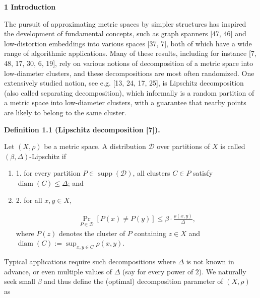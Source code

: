\par\medskip\noindent\textbf{1 Introduction}\par
The pursuit of approximating metric spaces by simpler structures has inspired the development of fundamental concepts, such as graph spanners [47, 46] and low-distortion embeddings into various spaces [37, 7], both of which have a wide range of algorithmic applications. Many of these results, including for instance [7, 48, 17, 30, 6, 19], rely on various notions of decomposition of a metric space into low-diameter clusters, and these decompositions are most often randomized. One extensively studied notion, see e.g. [13, 24, 17, 25], is Lipschitz decomposition (also called separating decomposition), which informally is a random partition of a metric space into low-diameter clusters, with a guarantee that nearby points are likely to belong to the same cluster.
\par
\par
\par\medskip\noindent\textbf{Definition 1.1 (Lipschitz decomposition [7]).}\par
Let $(X,\rho)$ be a metric space. A distribution $\mathcal{D}$ over partitions of $X$ is called $(\beta,\Delta)$-Lipschitz if
\par
\begin{enumerate}
\item  1. 
for every partition $P\in\operatorname{supp}(\mathcal{D})$, all clusters $C\in P$ satisfy $\operatorname{diam}(C)\leq\Delta$; and
\par
\par
\item  2. 
for all $x,y\in X$,
\par
\[\begin{aligned}
\Pr_{P\in\mathcal{D}}[P(x)\neq P(y)]\leq\beta\cdot\tfrac{\rho(x,y)}{\Delta},
\end{aligned}\]
where $P(z)$ denotes the cluster of $P$ containing $z\in X$ and $\operatorname{diam}(C):=\sup_{x,y\in C}\rho(x,y)$.
\par
\par
\end{enumerate}
\par
\par
Typical applications require such decompositions where $\Delta$ is not known in advance, or even multiple values of $\Delta$ (say for every power of $2$). We naturally seek small $\beta$ and thus define the (optimal) decomposition parameter of $(X,\rho)$ as
